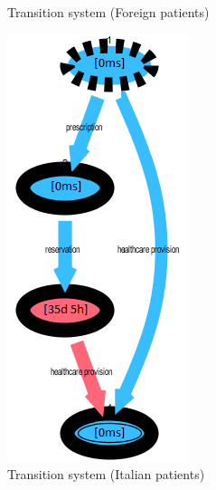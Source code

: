 \begin{figure} [htbp]
\begin{minipage}[t]{0.3\textwidth}
\caption{Transition system (Foreign patients)}
\end{minipage}
\begin{minipage}[t]{0.3\textwidth}
\includegraphics[width=\textwidth, keepaspectratio]{AmbulatorioSojournItalians}
\caption{Transition system (Italian patients)}
\end{minipage}
\end{figure}\\
